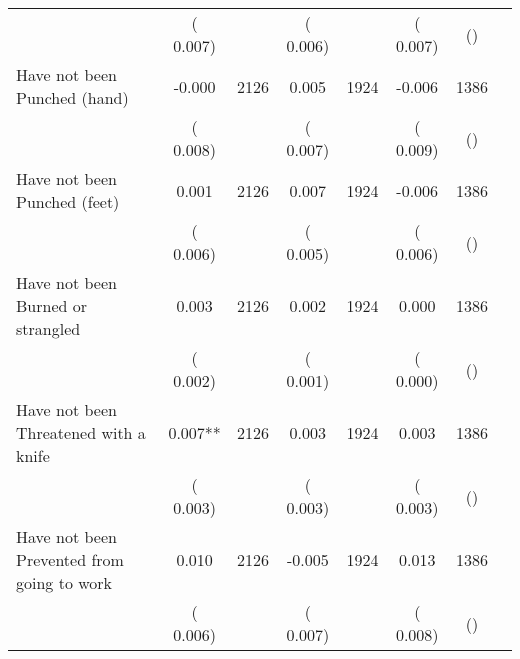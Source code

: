\begin{tabular}{l*{6}{c}}
                       &       (       0.007)            &                               &       (       0.006)            &                               &       (       0.007)            &       () &                  \\
Have not been Punched (hand)        &             -0.000      &       2126       &              0.005      &       1924       &             -0.006      &       1386  &  &              \\
                       &       (       0.008)            &                               &       (       0.007)            &                               &       (       0.009)            &       () &                  \\
Have not been Punched (feet)        &              0.001      &       2126       &              0.007      &       1924       &             -0.006      &       1386  &  &              \\
                       &       (       0.006)            &                               &       (       0.005)            &                               &       (       0.006)            &       () &                  \\
Have not been Burned or strangled        &              0.003      &       2126       &              0.002      &       1924       &              0.000      &       1386  &  &              \\
                       &       (       0.002)            &                               &       (       0.001)            &                               &       (       0.000)            &       () &                  \\
Have not been Threatened with a knife        &              0.007**      &       2126       &              0.003      &       1924       &              0.003      &       1386  &  &              \\
                       &       (       0.003)            &                               &       (       0.003)            &                               &       (       0.003)            &       () &                  \\
Have not been Prevented from going to work        &              0.010      &       2126       &             -0.005      &       1924       &              0.013      &       1386  &  &              \\
                       &       (       0.006)            &                               &       (       0.007)            &                               &       (       0.008)            &       () &                  \\

\end{tabular}

